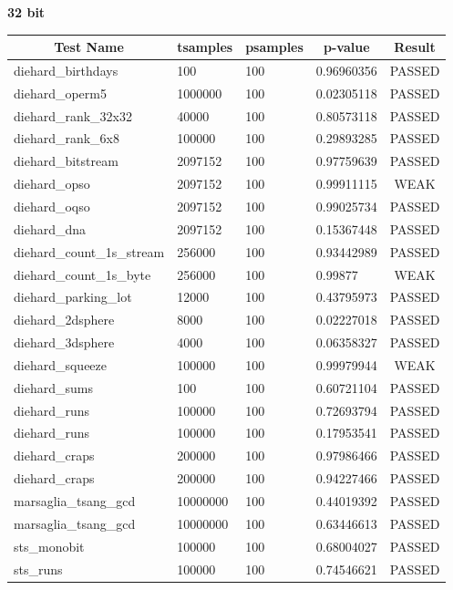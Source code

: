 \documentclass[titlepage, 11pt]{article}
\begin{document}
\textbf{32 bit}
\begin{table}[!htb]
\begin{tabular}{l|l|l|l|c}
\hline
\multicolumn{1}{c|}{\textbf{Test Name}} & \multicolumn{1}{c|}{\textbf{tsamples}} & \multicolumn{1}{c|}{\textbf{psamples}} & \multicolumn{1}{c|}{\textbf{p-value}} & \textbf{Result} \\ \hline
diehard\_birthdays & 100 & 100 & 0.96960356 & PASSED \\
diehard\_operm5 & 1000000 & 100 & 0.02305118 & PASSED \\
diehard\_rank\_32x32 & 40000 & 100 & 0.80573118 & PASSED \\
diehard\_rank\_6x8 & 100000 & 100 & 0.29893285 & PASSED \\
diehard\_bitstream & 2097152 & 100 & 0.97759639 & PASSED \\
diehard\_opso & 2097152 & 100 & 0.99911115 & WEAK \\
diehard\_oqso & 2097152 & 100 & 0.99025734 & PASSED \\
diehard\_dna & 2097152 & 100 & 0.15367448 & PASSED \\
diehard\_count\_1s\_stream & 256000 & 100 & 0.93442989 & PASSED \\
diehard\_count\_1s\_byte & 256000 & 100 & 0.99877 & WEAK \\
diehard\_parking\_lot & 12000 & 100 & 0.43795973 & PASSED \\
diehard\_2dsphere & 8000 & 100 & 0.02227018 & PASSED \\
diehard\_3dsphere & 4000 & 100 & 0.06358327 & PASSED \\
diehard\_squeeze & 100000 & 100 & 0.99979944 & WEAK \\
diehard\_sums & 100 & 100 & 0.60721104 & PASSED \\
diehard\_runs & 100000 & 100 & 0.72693794 & PASSED \\
diehard\_runs & 100000 & 100 & 0.17953541 & PASSED \\
diehard\_craps & 200000 & 100 & 0.97986466 & PASSED \\
diehard\_craps & 200000 & 100 & 0.94227466 & PASSED \\
marsaglia\_tsang\_gcd & 10000000 & 100 & 0.44019392 & PASSED \\
marsaglia\_tsang\_gcd & 10000000 & 100 & 0.63446613 & PASSED \\
sts\_monobit & 100000 & 100 & 0.68004027 & PASSED \\
sts\_runs & 100000 & 100 & 0.74546621 & PASSED \\

\end{tabular}
\end{table}
\end{document}
